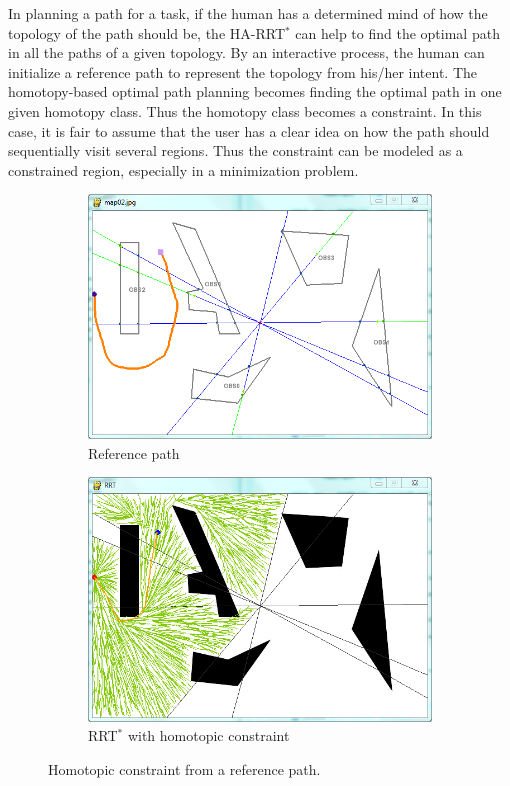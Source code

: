 \documentclass[letterpaper, 10 pt, conference]{ieeeconf}
\begin{document}
In planning a path for a task, if the human has a determined mind of how the topology of the path should be, the HA-RRT$^{*}$ can help to find the optimal path in all the paths of a given topology.
By an interactive process, the human can initialize a reference path to represent the topology from his/her intent.
The homotopy-based optimal path planning becomes finding the optimal path in one given homotopy class.
Thus the homotopy class becomes a constraint.
In this case, it is fair to assume that the user has a clear idea on how the path should sequentially visit several regions.
Thus the constraint can be modeled as a constrained region, especially in a minimization problem.

\begin{figure}
	\centering
	\begin{subfigure}[t]{0.47\linewidth}
		\centering
		\includegraphics[width=\textwidth]{fig/referenceHomotopy.png}
		\caption{Reference path}
		\label{fig:reference_path:reference}
	\end{subfigure}  
	\begin{subfigure}[t]{0.47\linewidth}
		\centering
		\includegraphics[width=\textwidth]{fig/homotopicConstrainedRRT.png}
		\caption{RRT$^{*}$ with homotopic constraint}
		\label{fig:reference_path:rrt}
	\end{subfigure}   
	\caption{Homotopic constraint from a reference path.}
	\label{fig:reference_path}
\end{figure}
\end{document}
